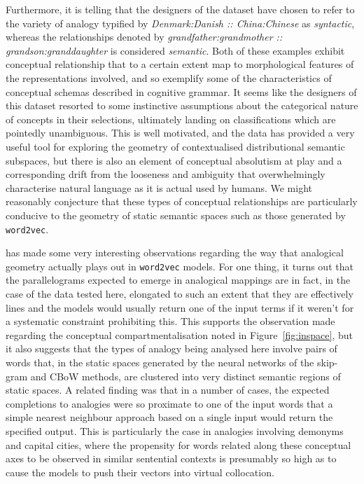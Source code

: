 Furthermore, it is telling that the designers of the dataset have chosen to refer to the variety of analogy typified by \emph{Denmark:Danish :: China:Chinese} as \emph{syntactic}, whereas the relationships denoted by \emph{grandfather:grandmother :: grandson:granddaughter} is considered \emph{semantic}.  Both of these examples exhibit conceptual relationship that to a certain extent map to morphological features of the representations involved, and so exemplify some of the characteristics of conceptual schemas described in  cognitive grammar.  It seems like the designers of this dataset resorted to some instinctive assumptions about the categorical nature of concepts in their selections, ultimately landing on classifications which are pointedly unambiguous.  This is well motivated, and the data has provided a very useful tool for exploring the geometry of contextualised distributional semantic subspaces, but there is also an element of conceptual absolutism at play and a corresponding drift from the looseness and ambiguity that overwhelmingly characterise natural language as it is actual used by humans.  We might reasonably conjecture that these types of conceptual relationships are particularly conducive to the geometry of static semantic spaces such as those generated by \texttt{word2vec}.

\cite{Linzen2016} has made some very interesting observations regarding the way that analogical geometry actually plays out in \texttt{word2vec} models.  For one thing, it turns out that the parallelograms expected to emerge in analogical mappings are in fact, in the case of the data tested here, elongated to such an extent that they are effectively lines and the models would usually return one of the input terms if it weren't for a systematic constraint prohibiting this.  This supports the observation made regarding the conceptual compartmentalisation noted in Figure~\ref{fig:inspace}, but it also suggests that the types of analogy being analysed here involve pairs of words that, in the static spaces generated by the neural networks of the skip-gram and CBoW methods, are clustered into very distinct semantic regions of static spaces.  A related finding was that in a number of cases, the expected completions to analogies were so proximate to one of the input words that a simple nearest neighbour approach based on a single input would return the specified output.  This is particularly the case in analogies involving demonyms and capital cities, where the propensity for words related along these conceptual axes to be observed in similar sentential contexts is presumably so high as to cause the models to push their vectors into virtual collocation.

